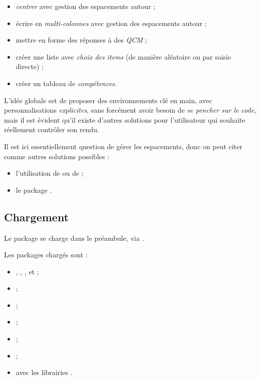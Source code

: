 \documentclass[french,11pt,a4paper]{article}
\begin{document}
\begin{itemize}
	\item \textit{centrer} avec gestion des espacements autour ;
	\item écrire en \textit{multi-colonnes} avec gestion des espacements autour ;
	\item mettre en forme des réponses à des \textit{QCM} ;
	\item créer une liste avec \textit{choix des items} (de manière aléatoire ou par saisie directe) ;
	\item créer un tableau de \textit{compétences}.
\end{itemize}

\smallskip

L'idée globale est de proposer des environnements clé en main, avec personnalisations \textit{explicites}, sans forcément avoir besoin de \textit{se pencher sur le code}, mais il est évident qu'il existe d'autres solutions pour l'utilisateur qui souhaite réellement contrôler son rendu.

\smallskip

Il est ici essentiellement question de gérer les espacements, donc on peut citer comme autres solutions possibles :

\begin{itemize}
	\item l'utilisation de  ou de  ;
	\item le package .
\end{itemize}

\subsection{Chargement}

Le package se charge dans le préambule, via .

Les packages chargés sont :

\begin{itemize}
	\item {}, , ,  et  ;
	\item {} ;
	\item {} ;
	\item {} ;
	\item {} ;
	\item {} ;
	\item {} avec les librairies .
\end{itemize}
\end{document}
